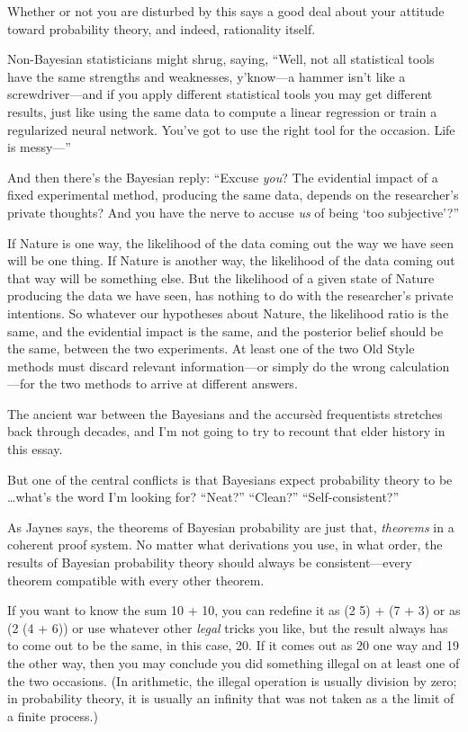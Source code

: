 {
 Whether or not you are disturbed by this says a good deal about
your attitude toward probability theory, and indeed, rationality
itself.}

{
 Non-Bayesian statisticians might shrug, saying,
``Well, not all statistical tools have the same
strengths and weaknesses, y'know---a hammer
isn't like a screwdriver---and if you apply different
statistical tools you may get different results, just like using the
same data to compute a linear regression or train a regularized neural
network. You've got to use the right tool for the
occasion. Life is messy---''}

{
 And then there's the Bayesian reply:
``Excuse \textit{you}? The evidential impact of a
fixed experimental method, producing the same data, depends on the
researcher's private thoughts? And you have the nerve
to accuse \textit{us} of being `too
subjective'?''}

{
 If Nature is one way, the likelihood of the data coming out the
way we have seen will be one thing. If Nature is another way, the
likelihood of the data coming out that way will be something else. But
the likelihood of a given state of Nature producing the data we have
seen, has nothing to do with the researcher's private
intentions. So whatever our hypotheses about Nature, the likelihood
ratio is the same, and the evidential impact is the same, and the
posterior belief should be the same, between the two experiments. At
least one of the two Old Style methods must discard relevant
information---or simply do the wrong calculation---for the two methods
to arrive at different answers.}

{
 The ancient war between the Bayesians and the accursèd
frequentists stretches back through decades, and I'm
not going to try to recount that elder history in this essay.}

{
 But one of the central conflicts is that Bayesians expect
probability theory to be \ldots what's the word
I'm looking for?
``Neat?''
``Clean?''
``Self-consistent?''}

{
 As Jaynes says, the theorems of Bayesian probability are just
that, \textit{theorems} in a coherent proof system. No matter what
derivations you use, in what order, the results of Bayesian probability
theory should always be consistent---every theorem compatible with
every other theorem.}

{
 If you want to know the sum 10 + 10, you can redefine it as (2
{\texttimes} 5) + (7 + 3) or as (2 {\texttimes} (4 + 6)) or use
whatever other \textit{legal} tricks you like, but the result always
has to come out to be the same, in this case, 20. If it comes out as 20
one way and 19 the other way, then you may conclude you did something
illegal on at least one of the two occasions. (In arithmetic, the
illegal operation is usually division by zero; in probability theory,
it is usually an infinity that was not taken as a the limit of a finite
process.)}

